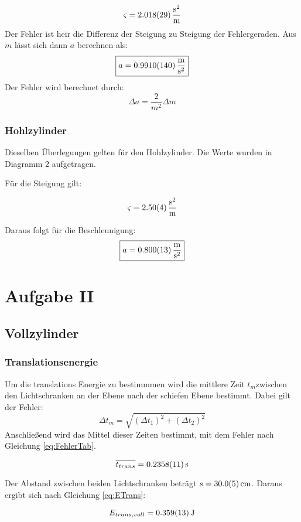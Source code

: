 \[\varsigma = \SI{2.018 \pm 0,029}{\frac{\second^2}{\meter}} \]
Der Fehler ist heir die Differenz der Steigung zu Steigung der Fehlergeraden.
Aus $m$ lässt sich dann $a$ berechnen als:
\[\boxed{a = \SI{ 0,9910 \pm 0,014 }{\frac{\meter}{\second^2}}}\]
Der Fehler wird berechnet durch:
\begin{equation}
    \Delta a = \frac{2}{m^2}\Delta m
\end{equation}


\subsubsection{Hohlzylinder}

Dieselben Überlegungen gelten für den Hohlzylinder. Die Werte wurden in Diagramm 2 aufgetragen.

Für die Steigung gilt:

\[\varsigma = \SI{2.50 \pm 0,04}{\frac{\second^2}{\meter}} \]

Daraus folgt für die Beschleunigung:
\[\boxed{a = \SI{ 0,800 \pm 0,013}{\frac{\meter}{\second^2}}}\]

\newpage
\section{Aufgabe II}

\subsection{Vollzylinder}

\subsubsection{Translationsenergie}
Um die translations Energie zu bestimmmen wird die mittlere Zeit $t_m$zwischen den Lichtschranken an der Ebene nach der schiefen Ebene bestimmt. Dabei gilt der Fehler:
\begin{equation}
    \Delta t_m = \sqrt{(\Delta t_1)^2+ (\Delta t_2)^2}
\end{equation}
Anschließend wird das Mittel dieser Zeiten bestimmt, mit dem Fehler nach Gleichung \ref{eq:FehlerTab}.

\[\overline{t_{trans}} = \SI{0,2358 \pm 0,0011}{\second}\]

Der Abstand zwischen beiden Lichtschranken beträgt $s = \SI{30,0 \pm 0,5}{\cm}$. Daraus ergibt sich nach Gleichung \ref{eq:ETrans}:

\[E_{trans,voll} = \SI{0,359\pm 0,013}{\joule}\]

